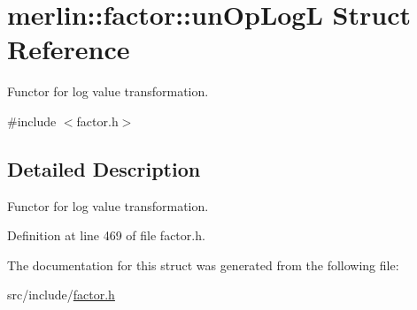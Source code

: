\hypertarget{structmerlin_1_1factor_1_1unOpLogL}{}\section{merlin\+:\+:factor\+:\+:un\+Op\+LogL Struct Reference}
\label{structmerlin_1_1factor_1_1unOpLogL}


Functor for log value transformation.  




{\ttfamily \#include $<$factor.\+h$>$}



\subsection{Detailed Description}
Functor for log value transformation. 

Definition at line 469 of file factor.\+h.



The documentation for this struct was generated from the following file\+:\begin{DoxyCompactItemize}
\item 
src/include/\hyperlink{factor_8h}{factor.\+h}\end{DoxyCompactItemize}
